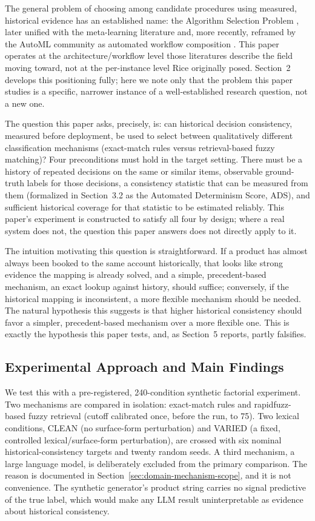 \documentclass[11pt]{article}
\begin{document}
The general problem of choosing among candidate procedures using measured,
historical evidence has an established name: the Algorithm Selection Problem
\citep{rice1976}, later unified with the meta-learning literature
\citep{smithmiles2009} and, more recently, reframed by the AutoML community as
automated workflow composition \citep{barbudo2023}. This paper operates at
the architecture/workflow level those literatures describe the field moving
toward, not at the per-instance level Rice originally posed. Section~2
develops this positioning fully; here we note only that the problem this
paper studies is a specific, narrower instance of a well-established research
question, not a new one.

The question this paper asks, precisely, is: can historical decision
consistency, measured before deployment, be used to select between
qualitatively different classification mechanisms (exact-match rules versus
retrieval-based fuzzy matching)? Four preconditions must hold in the target
setting. There must be a history of repeated decisions on the same or
similar items, observable ground-truth labels for those decisions, a
consistency statistic that can be measured from them (formalized in
Section~3.2 as the Automated Determinism Score, ADS), and sufficient
historical coverage for that statistic to be estimated reliably. This paper's
experiment is constructed to satisfy all four by design; where a real system
does not, the question this paper answers does not directly apply to it.

The intuition motivating this question is straightforward. If a product has
almost always been booked to the same account historically, that looks like
strong evidence the mapping is already solved, and a simple, precedent-based
mechanism, an exact lookup against history, should suffice; conversely,
if the historical mapping is inconsistent, a more flexible mechanism should
be needed. The natural hypothesis this suggests is that higher historical
consistency should favor a simpler, precedent-based mechanism over a more
flexible one. This is exactly the hypothesis this paper tests, and, as
Section~5 reports, partly falsifies.

\subsection{Experimental Approach and Main Findings}
\label{sec:approach-and-findings}

We test this with a pre-registered, 240-condition synthetic factorial
experiment. Two mechanisms are compared in isolation: exact-match rules and
rapidfuzz-based fuzzy retrieval (cutoff calibrated once, before the run, to
75). Two lexical conditions, CLEAN (no surface-form perturbation) and
VARIED (a fixed, controlled lexical/surface-form perturbation), are crossed
with six nominal historical-consistency targets and twenty random seeds. A
third mechanism, a large language model, is deliberately excluded from the
primary comparison. The reason is documented in
Section~\ref{sec:domain-mechanism-scope}, and it is not convenience. The
synthetic generator's product string carries no signal predictive of the
true label, which would make any LLM result uninterpretable as evidence about
historical consistency.
\end{document}

